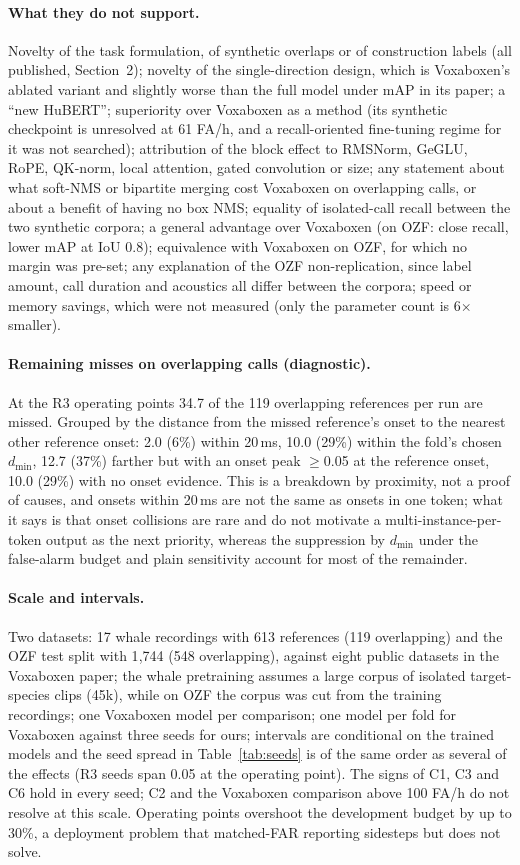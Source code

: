 \documentclass[10pt,twocolumn]{article}
\begin{document}
\paragraph{What they do not support.} Novelty of the task formulation, of synthetic overlaps or of construction labels (all published, Section~2); novelty of the single-direction design, which is Voxaboxen's ablated variant and slightly worse than the full model under mAP in its paper; a ``new HuBERT''; superiority over Voxaboxen as a method (its synthetic checkpoint is unresolved at 61 FA/h, and a recall-oriented fine-tuning regime for it was not searched); attribution of the block effect to RMSNorm, GeGLU, RoPE, QK-norm, local attention, gated convolution or size; any statement about what soft-NMS or bipartite merging cost Voxaboxen on overlapping calls, or about a benefit of having no box NMS; equality of isolated-call recall between the two synthetic corpora; a general advantage over Voxaboxen (on OZF: close recall, lower mAP at IoU 0.8); equivalence with Voxaboxen on OZF, for which no margin was pre-set; any explanation of the OZF non-replication, since label amount, call duration and acoustics all differ between the corpora; speed or memory savings, which were not measured (only the parameter count is 6$\times$ smaller).
\paragraph{Remaining misses on overlapping calls (diagnostic).} At the R3 operating points 34.7 of the 119 overlapping references per run are missed. Grouped by the distance from the missed reference's onset to the nearest other reference onset: 2.0 (6\%) within 20\,ms, 10.0 (29\%) within the fold's chosen $d_{\min}$, 12.7 (37\%) farther but with an onset peak $\ge$0.05 at the reference onset, 10.0 (29\%) with no onset evidence. This is a breakdown by proximity, not a proof of causes, and onsets within 20\,ms are not the same as onsets in one token; what it says is that onset collisions are rare and do not motivate a multi-instance-per-token output as the next priority, whereas the suppression by $d_{\min}$ under the false-alarm budget and plain sensitivity account for most of the remainder.
\paragraph{Scale and intervals.} Two datasets: 17 whale recordings with 613 references (119 overlapping) and the OZF test split with 1{,}744 (548 overlapping), against eight public datasets in the Voxaboxen paper; the whale pretraining assumes a large corpus of isolated target-species clips (45k), while on OZF the corpus was cut from the training recordings; one Voxaboxen model per comparison; one model per fold for Voxaboxen against three seeds for ours; intervals are conditional on the trained models and the seed spread in Table~\ref{tab:seeds} is of the same order as several of the effects (R3 seeds span 0.05 at the operating point). The signs of C1, C3 and C6 hold in every seed; C2 and the Voxaboxen comparison above 100 FA/h do not resolve at this scale. Operating points overshoot the development budget by up to 30\%, a deployment problem that matched-FAR reporting sidesteps but does not solve.
\end{document}
